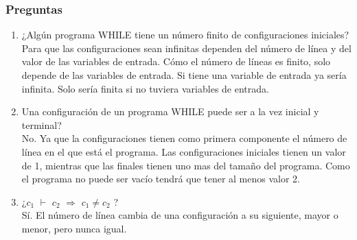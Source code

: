 \documentclass[xcolor=table]{beamer}
\begin{document}
\begin{frame}[fragile]\frametitle{Preguntas} \footnotesize

\begin{enumerate}\footnotesize
    \item ¿Algún	programa	WHILE	tiene	un	número	finito	de	configuraciones	iniciales?\\
    \hspace{0.3cm} \scriptsize  \textcolor{chicagoblue}{Para que las configuraciones sean infinitas dependen del número de línea y del valor de las variables de entrada. Cómo el número de líneas es finito, solo depende de las variables de entrada. Si tiene una variable de entrada ya sería infinita. Solo sería finita si no tuviera variables de entrada.}
    \footnotesize
    \item Una	configuración	de	un	programa	WHILE	puede	ser	a	la	vez	inicial	y	terminal?\\
        \hspace{0.3cm} \scriptsize \textcolor{chicagoblue}{No. Ya que la configuraciones tienen como primera componente el número de línea en el que está el programa. Las configuraciones iniciales tienen un valor de 1, mientras que las finales tienen uno mas del tamaño del programa. Como el programa no puede ser vacío tendrá que tener al menos valor 2. }
    \footnotesize
    
    \item ¿$c_1$ $\vdash$ $c_2$ $\Rightarrow$  $c_1 \neq c_2$ ?\\
        \hspace{0.3cm} \scriptsize \textcolor{chicagoblue}{Sí.	El número de línea cambia de una configuración a su siguiente, mayor o menor, pero nunca igual.}
    
       
\end{enumerate}


\end{frame}
\end{document}
